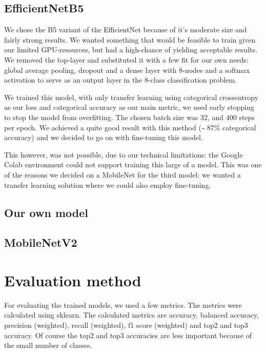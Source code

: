 \documentclass[twocolumn]{article}
\begin{document}
	\subsection{EfficientNetB5}
	
	We chose the B5 variant of the EfficientNet because of it's moderate size and fairly strong results. We wanted something that would be feasible to train given our limited GPU-resources, but had a high-chance of yielding acceptable results. We removed the top-layer and substituted it with a few fit for our own needs: global average pooling, dropout and a dense layer with 8-nodes and a softmax activation to serve as an output layer in the 8-class classification problem.
	
	We trained this model, with only transfer learning using categorical crossentropy as our loss and categorical accuracy as our main metric, we used early stopping to stop the model from overfitting. The chosen batch size was 32, and 400 steps per epoch. We achieved a quite good result with this method (\textasciitilde$~87\% $ categorical accuracy) and we decided to go on with fine-tuning this model. 
	
	This however, was not possible, due to our technical limitations: the Google Colab environment could not support training this large of a model. This was one of the reasons we decided on a MobileNet for the third model: we wanted a transfer learning solution where we could also employ fine-tuning. 
	
	\subsection{Our own model}
	
	
	
	\subsection{MobileNetV2}
	
	
	
	\section{Evaluation method}
	For evaluating the trained models, we used a few metrics. The metrics were calculated using sklearn. The calculated metrics are accuracy, balanced accuracy, precision (weighted), recall (weighted), f1 score (weighted) and top2 and top3 accuracy. Of course the top2 and top3 accuracies are less important because of the small number of classes.
	
\end{document}
